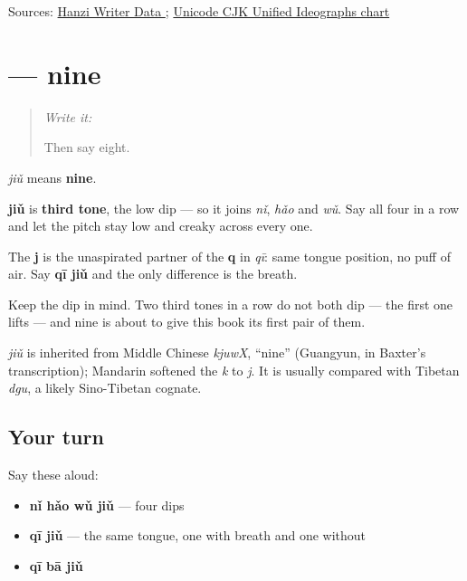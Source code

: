 \begin{tcolorbox}[breakable,colback=teal!4,colframe=teal!35!black,title={Before you move on}]
Sources: \href{https://raw.githubusercontent.com/chanind/hanzi-writer-data/68d10a4b21150cae5e1ebbd223eed289cf32d90c/data/\%E4\%B9\%9D.json}{Hanzi Writer Data }; \href{https://www.unicode.org/charts/PDF/U4E00.pdf}{Unicode CJK Unified Ideographs chart}
\end{tcolorbox}
\section[\texorpdfstring{\zh{九} (jiǔ)}{九 (jiǔ)}]{ — nine}

\label{lesson:ZH-C20-jiu}



\begin{quote}
\emph{Write it:} 

Then say eight.
\end{quote}

\begin{sounds}
\textbf{} \emph{jiǔ} means \textbf{nine}.

\textbf{jiǔ} is \textbf{third tone}, the low dip — so it joins \emph{nǐ}, \emph{hǎo} and \emph{wǔ}. Say all four in a row and let the pitch stay low and creaky across every one.

The \textbf{j} is the unaspirated partner of the \textbf{q} in \emph{qī}: same tongue position, no puff of air. Say \textbf{qī jiǔ} and the only difference is the breath.

Keep the dip in mind. Two third tones in a row do not both dip — the first one lifts — and nine is about to give this book its first pair of them.
\end{sounds}

\begin{cousinweb}
\textbf{} \emph{jiǔ} is inherited from Middle Chinese \emph{kjuwX}, \textquotedblleft{}nine\textquotedblright{} (Guangyun, in Baxter's transcription); Mandarin softened the \emph{k} to \emph{j}. It is usually compared with Tibetan \emph{dgu}, a likely Sino-Tibetan cognate.
\end{cousinweb}

\subsection*{Your turn}
Say these aloud:

\begin{itemize}
\raggedright
  \item \textbf{nǐ hǎo wǔ jiǔ} — four dips
  \item \textbf{qī jiǔ} — the same tongue, one with breath and one without
  \item \textbf{qī bā jiǔ}
\end{itemize}

